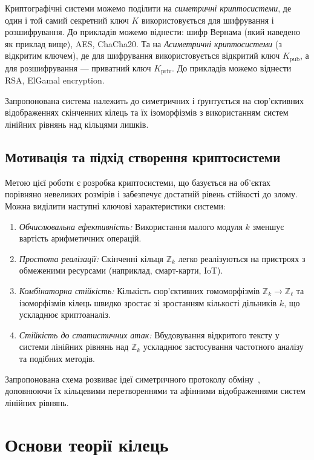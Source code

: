 Криптографічні системи можемо поділити на \emph{симетричні криптосистеми}, де один і той самий секретний ключ \(K\) використовується для шифрування і розшифрування.
До прикладів можемо віднести: шифр Вернама (який наведено як приклад вище), AES, ChaCha20.
Та на \emph{Асиметричні криптосистеми} (з відкритим ключем), де для шифрування використовується відкритий ключ \(K_{\text{pub}}\), а для розшифрування — приватний ключ \(K_{\text{priv}}\).
До прикладів можемо віднести RSA, ElGamal encryption.

Запропонована система належить до симетричних і ґрунтується на сюр'єктивних відображеннях скінченних кілець та їх ізоморфізмів з використанням систем лінійних рівнянь над кільцями лишків.

\subsection{Мотивація та підхід створення криптосистеми}
\label{subsec:motivation}

Метою цієї роботи є розробка криптосистеми, що базується на об'єктах порівняно невеликих розмірів і забезпечує достатній рівень стійкості до злому.
Можна виділити наступні ключові характеристики системи:

\begin{enumerate}
    \item \emph{Обчислювальна ефективність:} Використання малого модуля \(k\) зменшує вартість арифметичних операцій.
    \item \emph{Простота реалізації:} Скінченні кільця \(\mathbb{Z}_k\) легко реалізуються на пристроях з обмеженими ресурсами (наприклад, смарт-карти, IoT).
    \item \emph{Комбінаторна стійкість:} Кількість сюр’єктивних гомоморфізмів \(\mathbb{Z}_k \to \mathbb{Z}_\ell\) та ізоморфізмів кілець швидко зростає зі зростанням кількості дільників \(k\), що ускладнює криптоаналіз.
    \item \emph{Стійкість до статистичних атак:} Вбудовування відкритого тексту у системи лінійних рівнянь над \(\mathbb{Z}_k\) ускладнює застосування частотного аналізу та подібних методів.
\end{enumerate}

Запропонована схема розвиває ідеї симетричного протоколу обміну~\cite{5}, доповнюючи їх кільцевими перетвореннями та афінними відображеннями систем лінійних рівнянь.


\section{Основи теорії кілець}
\label{sec:ring_theory}

